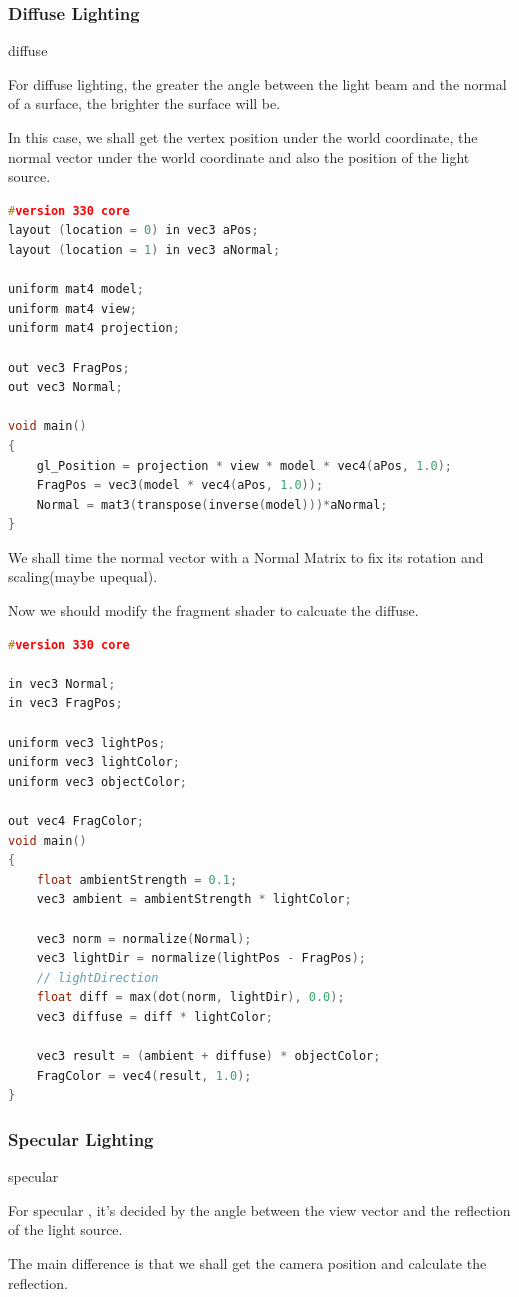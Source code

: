 \documentclass[acmtog]{acmart}
\begin{document}
\subsubsection{Diffuse Lighting}
diffuse
\par For diffuse lighting, the greater the angle between the light beam and the normal of a surface, the brighter the surface will be.
\par In this case, we shall get the vertex position under the world coordinate, the normal vector under the world coordinate and also the position of the light source.
 \begin{lstlisting}[frame=single,breaklines=true,language=c++,basicstyle=\footnotesize\ttfamily]
#version 330 core
layout (location = 0) in vec3 aPos;
layout (location = 1) in vec3 aNormal;

uniform mat4 model;
uniform mat4 view;
uniform mat4 projection;

out vec3 FragPos;  
out vec3 Normal;

void main()
{
	gl_Position = projection * view * model * vec4(aPos, 1.0);
	FragPos = vec3(model * vec4(aPos, 1.0));
	Normal = mat3(transpose(inverse(model)))*aNormal;
}
 \end{lstlisting}
\par We shall time the normal vector with a Normal Matrix to fix its rotation and scaling(maybe upequal).

\par Now we should modify the fragment shader to calcuate the diffuse.
\begin{lstlisting}[frame=single,breaklines=true,language=c++,basicstyle=\footnotesize\ttfamily]
#version 330 core

in vec3 Normal;
in vec3 FragPos;

uniform vec3 lightPos;
uniform vec3 lightColor;
uniform vec3 objectColor;

out vec4 FragColor;
void main()
{
	float ambientStrength = 0.1;
	vec3 ambient = ambientStrength * lightColor;

	vec3 norm = normalize(Normal);
	vec3 lightDir = normalize(lightPos - FragPos);
	// lightDirection 
	float diff = max(dot(norm, lightDir), 0.0);
	vec3 diffuse = diff * lightColor;

	vec3 result = (ambient + diffuse) * objectColor;
	FragColor = vec4(result, 1.0);
}
 \end{lstlisting}
\subsubsection{Specular Lighting}
specular 
\par For specular , it's decided by the angle between the view vector and the reflection of the light source.
\par The main difference is that we shall get the camera position and calculate the reflection.
\end{document}

